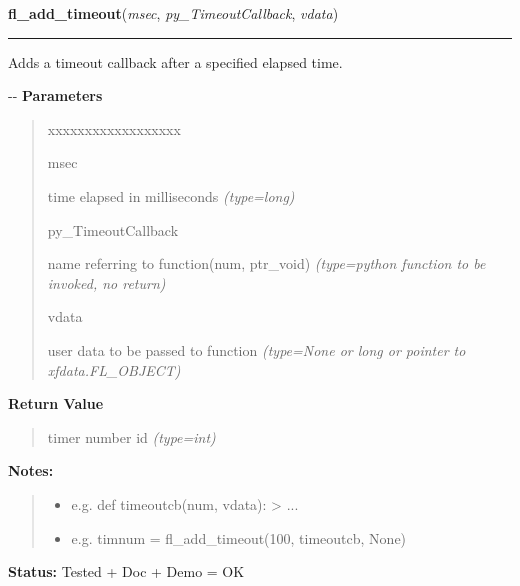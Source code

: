\hspace{.8\funcindent}\begin{boxedminipage}{\funcwidth}

    \raggedright \textbf{fl\_add\_timeout}(\textit{msec}, \textit{py\_TimeoutCallback}, \textit{vdata})

    \vspace{-1.5ex}

    \rule{\textwidth}{0.5\fboxrule}
\setlength{\parskip}{2ex}

Adds a timeout callback after a specified elapsed time.

-{}-
\setlength{\parskip}{1ex}
      \textbf{Parameters}
      \vspace{-1ex}

      \begin{quote}
        \begin{Ventry}{xxxxxxxxxxxxxxxxxx}

          \item[msec]


time elapsed in milliseconds
            {\it (type=long)}

          \item[py\_TimeoutCallback]


name referring to function(num, ptr\_void)
            {\it (type=python function to be invoked, no return)}

          \item[vdata]


user data to be passed to function
            {\it (type=None or long or pointer to xfdata.FL\_OBJECT)}

        \end{Ventry}

      \end{quote}

      \textbf{Return Value}
    \vspace{-1ex}

      \begin{quote}

timer number id
      {\it (type=int)}

      \end{quote}

\textbf{Notes:}
\begin{quote}
  \begin{itemize}

  \item
    \setlength{\parskip}{0.6ex}

e.g. def timeoutcb(num, vdata): > ...


  \item 
e.g. timnum = fl\_add\_timeout(100, timeoutcb, None)


\end{itemize}

\end{quote}

\textbf{Status:} 
Tested + Doc + Demo = OK


    \end{boxedminipage}

